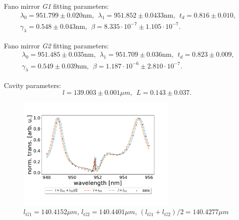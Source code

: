 Fano mirror \emph{G1} fitting parameters:
\begin{equation}
    \begin{split}
        &\lambda_0 = 951.799 \pm 0.020 \text{nm}, \:\: \lambda_1 = 951.852 \pm 0.0433 \text{nm}, \:\: t_d = 0.816 \pm 0.010, \:\: \\&\gamma_{\lambda} = 0.548 \pm 0.043 \text{nm}, \:\: \beta = 8.335 \cdot 10^{-7} \pm 1.105 \cdot 10^{-7}.
    \end{split}
\end{equation}

Fano mirror \emph{G2} fitting parameters:
\begin{equation}
    \begin{split}
        &\lambda_0 = 951.485 \pm 0.035 \text{nm}, \:\: \lambda_1 = 951.709 \pm 0.036 \text{nm}, \:\: t_d = 0.823 \pm 0.009, \:\: \\&\gamma_{\lambda} = 0.549 \pm 0.039 \text{nm}, \:\: \beta = 1.187 \cdot 10^{-6} \pm 2.810 \cdot 10^{-7}.
    \end{split}
\end{equation}

Cavity parameters:
\begin{equation}
    l = 139.003 \pm 0.001 \mu m, \:\: L = 0.143 \pm 0.037.
\end{equation}

\begin{figure}[h!]
    \centering
    \includegraphics[width=0.7\textwidth]{figures/results/129um_long_scan_sim_comparison.pdf}
    \caption{$l_{G1} = 140.4152 \mu m$, $l_{G2} = 140.4401 \mu m$, $(l_{G1} + l_{G2})/2 = 140.4277 \mu m$}
    \label{fig:129um_long_scan_sim_comparison}
\end{figure}

